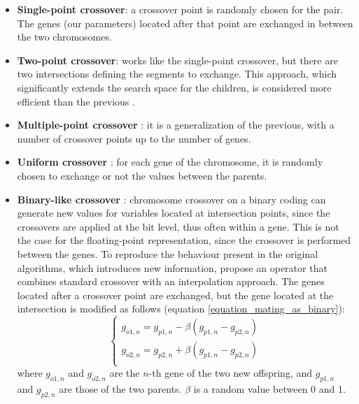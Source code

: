 \documentclass{ametsoc}
\begin{document}
\begin{itemize}
	\item \textbf{Single-point crossover}: a crossover point is randomly chosen for the pair. The genes (our parameters) located after that point are exchanged in between the two chromosomes.
	
	\item \textbf{Two-point crossover}: works like the single-point crossover, but there are two intersections defining the segments to exchange. This approach, which significantly extends the search space for the children, is considered more efficient than the previous \citep{Beasley1993a, Haupt2004}.
	
	\item \textbf{Multiple-point crossover} \citep{DeJong1975a}: it is a generalization of the previous, with a number of crossover points up to the number of genes.
	
	\item \textbf{Uniform crossover} \citep{Syswerda1989}: for each gene of the chromosome, it is randomly chosen to exchange or not the values between the parents.
	
	\item \textbf{Binary-like crossover} \citep{Haupt2004}: chromosome crossover on a binary coding can generate new values for variables located at intersection points, since the crossovers are applied at the bit level, thus often within a gene. This is not the case for the floating-point representation, since the crossover is performed between the genes. To reproduce the behaviour present in the original algorithms, which introduces new information, \citet{Haupt2004} propose an operator that combines standard crossover with an interpolation approach. The genes located after a crossover point are exchanged, but the gene located at the intersection is modified as follows (equation \ref{equation_mating_as_binary}):
	\begin{equation}
	\left\lbrace \begin{array}{l} 
	g_{o1,n} = g_{p1,n} - \beta (g_{p1,n} - g_{p2,n}) \\
	g_{o2,n} = g_{p2,n} + \beta (g_{p1,n} - g_{p2,n}) \\
	\end{array} \right.
	\label{equation_mating_as_binary}
	\end{equation}
	where $g_{o1,n}$ and $g_{o2,n}$ are the $n$-th gene of the two new offspring, and $g_{p1,n}$ and $g_{p2,n}$ are those of the two parents. $\beta$ is a random value between 0 and 1.
	

\end{itemize}
\end{document}
